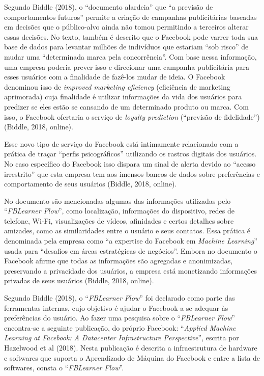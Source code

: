 Segundo Biddle (2018), o ``documento alardeia'' que ``a previsão de
comportamentos futuros'' permite a criação de campanhas publicitárias
baseadas em decisões que o público-alvo ainda não tomou permitindo a
terceiros alterar essas decisões. No texto, também é descrito que o
Facebook pode varrer toda sua base de dados para levantar milhões de
indivíduos que estariam ``sob risco'' de mudar uma ``determinada marca
pela concorrência''. Com base nessa informação, uma empresa poderia
prever isso e direcionar uma campanha publicitária para esses usuários
com a finalidade de fazê-los mudar de ideia.
O Facebook denominou isso de \emph{improved marketing eficiency} (eficiência de marketing
aprimorada) cuja finalidade é utilizar informações da vida dos usuários
para predizer se eles estão se cansando de um determinado produto ou
marca. Com isso, o Facebook ofertaria o serviço de \emph{loyalty
prediction} (``previsão de fidelidade'') (Biddle, 2018, online).

Esse novo tipo de serviço do Facebook está intimamente relacionado com a
prática de traçar ``perfis psicográficos'' utilizando os rastros
digitais dos usuários. No caso específico do Facebook isso dispara um
sinal de alerta devido ao ``acesso irrestrito'' que esta empresa tem aos
imensos bancos de dados sobre preferências e comportamento de seus
usuários (Biddle, 2018, online).

No documento são mencionadas algumas das informações utilizadas pelo
``\emph{FBLearner Flow}'', como localização, informações do dispositivo,
redes de telefone, Wi-Fi, visualizações de vídeos, afinidades e certos
detalhes sobre amizades, como as similaridades entre o usuário e seus
contatos. Essa prática é denominada pela empresa como ``a expertise do
Facebook em \emph{Machine Learning}'' usada para ``desafios em áreas
estratégicas de negócios''. Embora no documento o Facebook afirme que
todas as informações são agregadas e anonimizadas, preservando a
privacidade dos usuários, a empresa está monetizando informações
privadas de seus usuários (Biddle, 2018, online).

Segundo Biddle (2018), o ``\emph{FBLearner Flow}'' foi declarado como
parte das ferramentas internas, cujo objetivo é ajudar o Facebook a se
adequar às preferências do usuário. Ao fazer uma pesquisa sobre o
``\emph{FBLearner Flow}'' encontra-se a seguinte publicação, do próprio
Facebook: ``\emph{Applied Machine Learning at Facebook: A Datacenter
Infrastructure Perspective}'', escrita por Hazelwood et al (2018). Nesta
publicação é descrita a infraestrutura de hardware e softwares que
suporta o Aprendizado de Máquina do Facebook e entre a lista de
softwares, consta o ``\emph{FBLearner Flow}''.

